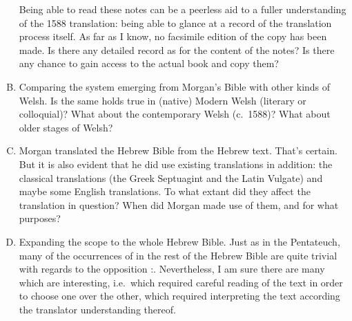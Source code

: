 \begin{enumerate}[A.]
		Being able to read these notes can be a peerless aid to a fuller understanding of the 1588 translation: being able to glance at a record of the translation process itself. As far as I know, no facsimile edition of the copy has been made. Is there any detailed record as for the content of the notes? Is there any chance to gain access to the actual book and copy them?

	\item Comparing the system emerging from Morgan’s Bible with other kinds of Welsh. Is the same holds true in (native) Modern Welsh (literary or colloquial)? What about the contemporary Welsh (c.~1588)? What about older stages of Welsh?

	\item Morgan translated the Hebrew Bible from the Hebrew text. That’s certain. But it is also evident that he did use existing translations in addition: the classical translations (the Greek Septuagint and the Latin Vulgate) and maybe some English translations. To what extant did they affect the translation in question? When did Morgan made use of them, and for what purposes?

	\item Expanding the scope to the whole Hebrew Bible. Just as in the Pentateuch, many of the occurrences of {\shama} in the rest of the Hebrew Bible are quite trivial with regards to the opposition \mbox{:}. Nevertheless, I am sure there are many which are interesting, i.e.\ which required careful reading of the text in order to choose one over the other, which required interpreting the text according the translator understanding thereof.


\end{enumerate}
